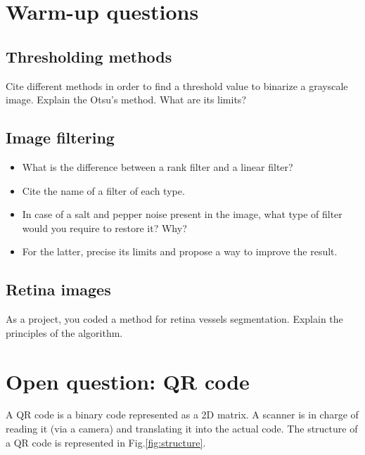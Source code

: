
\section{Warm-up questions}

\subsection{Thresholding methods}
\begin{qbox}
Cite different methods in order to find a threshold value to binarize a grayscale image. Explain the Otsu's method. What are its limits?
\end{qbox}

\subsection{Image filtering}
\begin{qbox}
 \begin{itemize}
  \item What is the difference between a rank filter and a linear filter?
  \item Cite the name of a filter of each type.
  \item In case of a salt and pepper noise present in the image, what type of filter would you require to restore it? Why?
  \item For the latter, precise its limits and propose a way to improve the result.
 \end{itemize}

\end{qbox}

\subsection{Retina images}
\begin{qbox}
As a project, you coded a method for retina vessels segmentation. Explain the principles of the algorithm.
\end{qbox}



\section{Open question: QR code}
A QR code is a binary code represented as a 2D matrix. A scanner is in charge of reading it (via a camera) and translating it into the actual code. The structure of a QR code is represented in Fig.\ref{fig:structure}.

